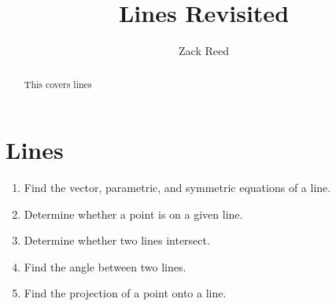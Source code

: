 \documentclass{ximera}
\author{Zack Reed}
\title{Lines Revisited}
\begin{document}
\begin{abstract}

    This covers lines

\end{abstract}
\maketitle



\section{Lines}

  \begin{enumerate}
  \item Find the vector, parametric, and symmetric equations of a line.
  \item Determine whether a point is on a given line.
  \item Determine whether two lines intersect.
  \item Find the angle between two lines.
  \item Find the projection of a point onto a line.
  \end{enumerate}
\end{document}
